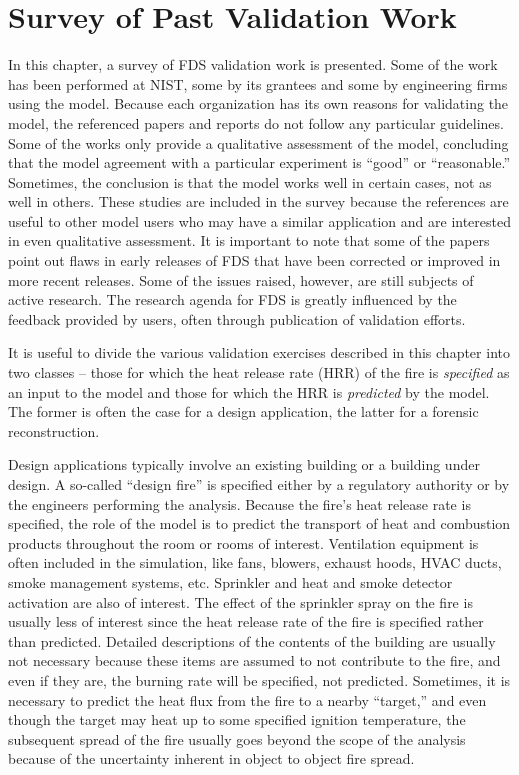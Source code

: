 
\chapter{Survey of Past Validation Work}

\label{Survey_Chapter}

In this chapter, a survey of FDS validation work is presented. Some of the work has been  performed at NIST, some by its grantees and some by
engineering firms using the model.  Because each organization has its  own reasons for  validating the model, the  referenced papers and reports do
not follow any particular guidelines. Some of the works only provide  a qualitative assessment  of the model,  concluding that the  model  agreement
with  a  particular  experiment  is ``good''  or ``reasonable.'' Sometimes, the conclusion is that the model works well in certain cases, not as well
in others. These studies are included in the survey because the references  are useful to other model users who may have a similar application  and
are interested in even qualitative assessment. It is important to note  that some of the papers point out flaws in early releases of FDS that have
been corrected or improved in more recent  releases. Some of  the issues raised, however,  are still subjects of  active research. The  research
agenda for FDS  is greatly influenced  by   the  feedback   provided  by  users,   often  through publication of validation efforts.

It is useful to divide the various validation exercises described in this chapter into two classes -- those for which the
heat release rate (HRR) of the fire is {\em specified} as an input to the model and those for which the HRR
is {\em predicted} by the model. The former is often the case for a
design application, the latter for a forensic reconstruction. 

Design  applications  typically  involve  an existing  building  or  a building  under  design. A  so-called  ``design  fire'' is  specified either
by  a regulatory authority  or by the engineers  performing the analysis. Because the  fire's heat release rate is  specified, the role of the model
is to predict  the transport of heat and combustion products throughout  the room or  rooms of  interest. Ventilation  equipment is often included
in the simulation, like fans,  blowers, exhaust hoods, HVAC ducts,  smoke management systems,  etc. Sprinkler  and heat and smoke detector
activation are also of interest.  The effect of the sprinkler spray on the fire is usually less of interest since the heat release rate of the fire
is  specified rather  than  predicted. Detailed  descriptions of  the contents of the building are usually not necessary because these items are
assumed to not contribute to the fire,  and even if they are, the burning rate will be specified, not predicted.  Sometimes, it is necessary  to
predict the heat  flux from the fire  to a nearby ``target,''  and even though the target  may heat up  to some specified ignition  temperature, the
subsequent spread  of the  fire usually goes  beyond the scope  of the analysis because of the uncertainty  inherent in object to object fire spread.

